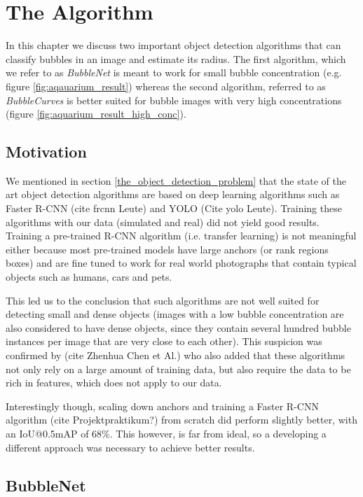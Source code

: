 \chapter{The Algorithm} \label{the_algorithm}
	In this chapter we discuss two important object detection algorithms that can classify bubbles in an image and estimate its radius. The first algorithm, which we refer to as \textit{BubbleNet} is meant to work for small bubble concentration (e.g. figure \ref{fig:aqauarium_result}) whereas the second algorithm, referred to as \textit{BubbleCurves} is better suited for bubble images with very high concentrations (figure \ref{fig:aquarium_result_high_conc}).
		
	\section{Motivation}
		We mentioned in section \ref{the_object_detection_problem} that the state of the art object detection algorithms are based on deep learning algorithms such as Faster R-CNN (cite frcnn Leute) and YOLO (Cite yolo Leute). Training these algorithms with our data (simulated and real) did not yield good results. Training a pre-trained R-CNN algorithm (i.e. transfer learning) is not meaningful either because most pre-trained models have large anchors (or rank regions boxes) and are fine tuned to work for real world photographs that contain typical objects such as humans, cars and pets. 
		
		This led us to the conclusion that such algorithms are not well suited for detecting small and dense objects (images with a low bubble concentration are also considered to have dense objects, since they contain several hundred bubble instances per image that are very close to each other). This suspicion was confirmed by (cite Zhenhua Chen et Al.) who also added that these algorithms not only rely on a large amount of training data, but also require the data to be rich in features, which does not apply to our data. 
		
	Interestingly though, scaling down anchors and training a Faster R-CNN algorithm (cite Projektpraktikum?)  from scratch did perform slightly better, with an IoU@0.5mAP of 68\%. This however, is far from ideal, so a developing a different approach was necessary to achieve better results. 
		
		
		
		
	\section{BubbleNet}\label{BubbleNet}
	
